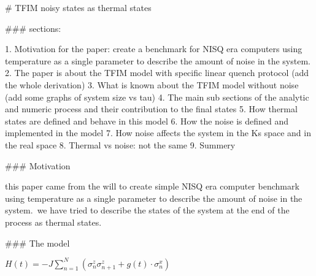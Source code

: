 # TFIM noisy states as thermal states

### sections:

1. Motivation for the paper: create a benchmark for NISQ era computers using temperature as a single parameter to describe the amount of noise in the system.
2. The paper is about the TFIM model with specific linear quench protocol (add the whole derivation)
3. What is known about the TFIM model without noise (add some graphs of system size vs tau)
4. The main sub sections of the analytic and numeric process and their contribution to the final states
5. How thermal states are defined and behave in this model
6. How the noise is defined and implemented in the model
7. How noise affects the system in the Ks space and in the real space
8. Thermal vs noise: not the same
9. Summery

### Motivation

this paper came from the will to create simple NISQ era computer benchmark using temperature as a single parameter to describe the amount of noise in the system.\ we have tried to describe the states of the system at the end of the process as thermal states.

### The model

$ H(t) = -J \sum_{n=1}^{N} \left( \sigma_n^z \sigma_{n+1}^z + g(t) \cdot \sigma_n^x \right) $
